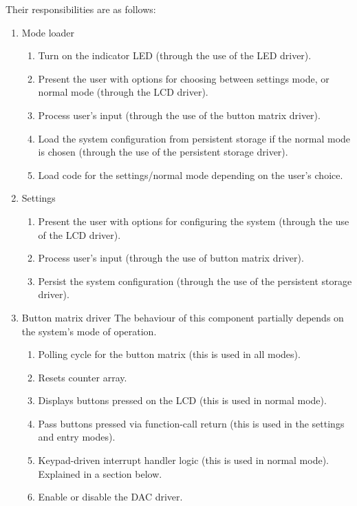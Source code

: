 \documentclass[11pt,a4paper
]{scrartcl}
\begin{document}
Their responsibilities are as follows:

\begin{enumerate}
   \item Mode loader
      \begin{enumerate}
         \item Turn on the indicator LED (through the use of the LED driver).
         \item Present the user with options for choosing between settings mode, or normal mode (through the LCD driver).
         \item Process user's input (through the use of the button matrix driver).
         \item Load the system configuration from persistent storage if the normal mode is chosen (through the use of the persistent storage driver).
         \item Load code for the settings/normal mode depending on the user's choice.
      \end{enumerate}

   \item Settings
      \begin{enumerate}
         \item Present the user with options for configuring the system (through the use of the LCD driver).
         \item Process user's input (through the use of button matrix driver).
         \item Persist the system configuration (through the use of the persistent storage driver).
      \end{enumerate}

   \item Button matrix driver
      The behaviour of this component partially depends on the system's mode of operation.   
      \begin{enumerate}
         \item Polling cycle for the button matrix (this is used in all modes).
         \item Resets counter array.
         \item Displays buttons pressed on the LCD (this is used in normal mode).
         \item Pass buttons pressed via function-call return (this is used in the settings and entry modes).
         \item Keypad-driven interrupt handler logic (this is used in normal mode). Explained in a section below.
         \item Enable or disable the DAC driver.
      \end{enumerate}
   

\end{enumerate}
\end{document}
